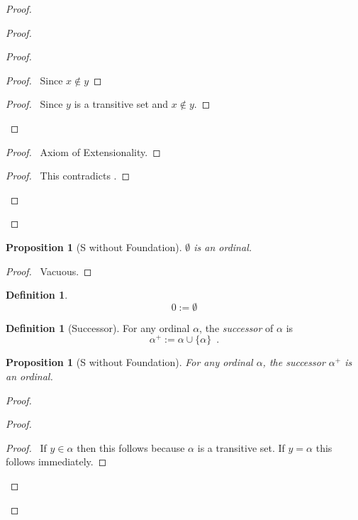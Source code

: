 \documentclass{book}
\let\qed\relax
\newtheorem{prop}[ax]{Proposition}
\theoremstyle{definition}
\newtheorem{df}[ax]{Definition}
\begin{document}
\begin{proof}
\begin{proof}
\begin{proof}
		\begin{proof}
			\pf\ Since $x \notin y$
		\end{proof}
		\begin{proof}
			\pf\ Since $y$ is a transitive set and $x \notin y$.
		\end{proof}
	\end{proof}
	\begin{proof}
		\pf\ Axiom of Extensionality.
	\end{proof}
	\qedstep
	\begin{proof}
		\pf\ This contradicts .
	\end{proof}
\end{proof}
\qed
\end{proof}

\begin{prop}[S without Foundation]
$\emptyset$ is an ordinal.
\end{prop}

\begin{proof}
\pf\ Vacuous. \qed
\end{proof}

\begin{df}
\[ 0 := \emptyset \]
\end{df}

\begin{df}[Successor]
For any ordinal $\alpha$, the \emph{successor} of $\alpha$ is
\[ \alpha^+ := \alpha \cup \{ \alpha \} \enspace . \]
\end{df}

\begin{prop}[S without Foundation]
For any ordinal $\alpha$, the successor $\alpha^+$ is an ordinal.
\end{prop}

\begin{proof}
\pf
{}
\begin{proof}
	\begin{proof}
		\pf\ If $y \in \alpha$ then this follows because $\alpha$ is a transitive set. If $y = \alpha$ this follows immediately.
	\end{proof}
\end{proof}
\qed
\end{proof}
\end{document}
